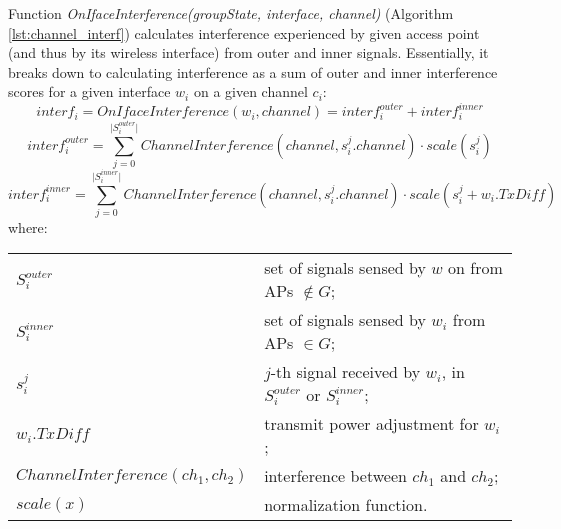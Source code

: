 Function \textit{OnIfaceInterference(groupState, interface, channel)} (Algorithm \ref{lst:channel_interf}) calculates interference experienced by given access point (and thus by its wireless interface) from outer and inner signals.
Essentially, it breaks down to calculating interference as a sum of outer and inner interference scores for a given interface $w_i$ on a given channel $c_i$:
\newenvironment{conditions}
  {\par\vspace{\abovedisplayskip}\noindent\begin{tabular}{>{$}l<{$} @{${}={}$} l}}
  {\end{tabular}\par\vspace{\belowdisplayskip}}
\begin{equation}
    interf_i = OnIfaceInterference(w_i, channel) = interf^{outer}_i + interf^{inner}_i
\end{equation}
\begin{equation}
    interf^{outer}_i = \sum_{j=0}^{\lvert S^{outer}_i \rvert} ChannelInterference(channel, s^{j}_i.channel) \cdot scale(s^j_i)
\end{equation}
\begin{equation}
    interf^{inner}_i = \sum_{j=0}^{\lvert S^{inner}_i \rvert} ChannelInterference(channel, s^{j}_i.channel) \cdot scale(s^j_i + w_i.TxDiff)
\end{equation}
where:
\begin{conditions}
    S^{outer}_i & set of signals sensed by $w$ on from APs $\notin G$; \\
    S^{inner}_i & set of signals sensed by $w_i$ from APs $\in G$; \\
    s^j_i       & $j$-th signal received by $w_i$, in $S^{outer}_i$ or $S^{inner}_i$; \\
    w_i.TxDiff  & transmit power adjustment for $w_i$; \\
    ChannelInterference(ch_1, ch_2)    & interference between $ch_1$ and $ch_2$; \\
    scale(x)    & normalization function. \\
\end{conditions}


